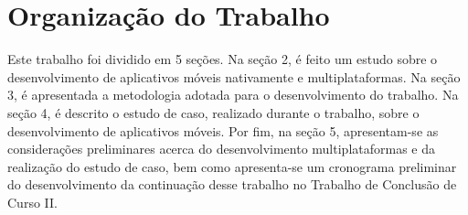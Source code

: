 
\section{Organização do Trabalho}

Este trabalho foi dividido em 5 seções. Na seção 2, é feito um estudo sobre o desenvolvimento de aplicativos móveis nativamente e multiplataformas. 
Na seção 3, é apresentada a metodologia adotada para o desenvolvimento do trabalho. Na seção 4, é descrito o estudo de caso, realizado durante o trabalho, sobre o desenvolvimento de aplicativos móveis.
Por fim, na seção 5, apresentam-se as considerações preliminares acerca do desenvolvimento multiplataformas e da realização do estudo de caso, bem como apresenta-se um cronograma preliminar do desenvolvimento 
da continuação desse trabalho no Trabalho de Conclusão de Curso II. 